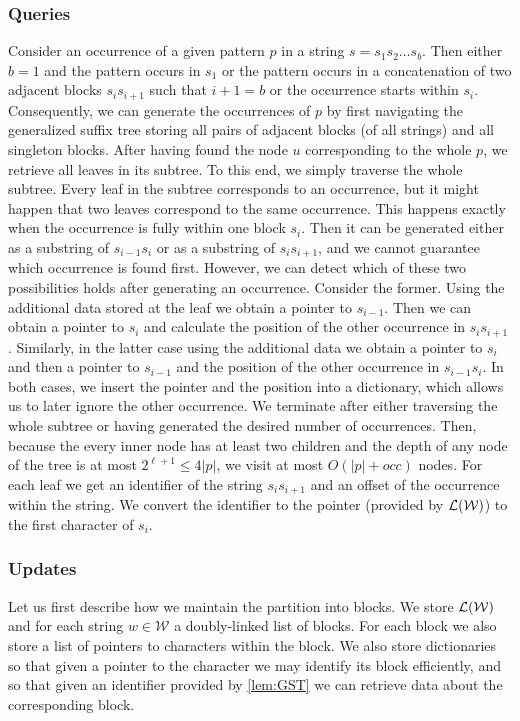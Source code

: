 \documentclass[a4paper]{article}
\theoremstyle{remark}
\newcommand{\coll}{\mathcal{W}}
\begin{document}
\subsubsection{Queries}
Consider an occurrence of a given pattern $p$ in a string $s=s_1 s_2 \ldots s_b$. Then either $b=1$
and the pattern occurs in $s_1$ or the pattern occurs in a concatenation of two adjacent blocks
$s_i s_{i+1}$ such that $i+1=b$  or the occurrence starts within $s_i$. Consequently, we can
generate the occurrences of $p$ by first navigating the generalized suffix tree storing all pairs
of adjacent blocks (of all strings) and all singleton blocks. After having found the node $u$
corresponding to the whole $p$, we retrieve all leaves in its subtree. To this end, we simply traverse
the whole subtree. Every leaf in the subtree corresponds to an occurrence, but it might happen
that two leaves correspond to the same occurrence. This happens exactly when the occurrence
is fully within one block $s_i$. Then it can be generated either as a substring of $s_{i-1}s_i$ or
as a substring of $s_i s_{i+1}$, and we cannot guarantee which occurrence is found first.
However, we can detect which of these two possibilities holds after generating an occurrence.
Consider the former. Using the additional data stored at the leaf we obtain a pointer to $s_{i-1}$.
Then we can obtain a pointer to $s_i$ and calculate the position of the other occurrence in $s_i s_{i+1}$.
Similarly, in the latter case using the additional data we obtain a pointer to $s_i$ and
then a pointer to $s_{i-1}$ and the position of the other occurrence in $s_{i-1} s_i$.
In both cases, we insert the pointer and the position into a dictionary, which allows us to later ignore
the other occurrence.
We terminate after either traversing the whole subtree or having generated the desired number of occurrences.
Then, because the every inner node has at least two children and the depth of any node of the
tree is at most $2^{\ell+1}\leq 4|p|$, we visit at most $O(|p|+occ)$ nodes.
For each leaf we get an identifier of the string $s_i s_{i+1}$ and an offset of the occurrence
within the string. We convert the identifier to the pointer (provided by $\lists(\coll)$) to the first character
of $s_i$.




\subsubsection{Updates}
Let us first describe how we maintain the partition into blocks.
We store $\lists(\coll)$ and for each string $w\in \coll$ a doubly-linked list of blocks.
For each block we also store a list of pointers to characters within the block. We also store dictionaries so that given a pointer to the character we may identify its block efficiently,
and so that given an identifier provided by \cref{lem:GST} we can retrieve data about the corresponding block.
\end{document}
